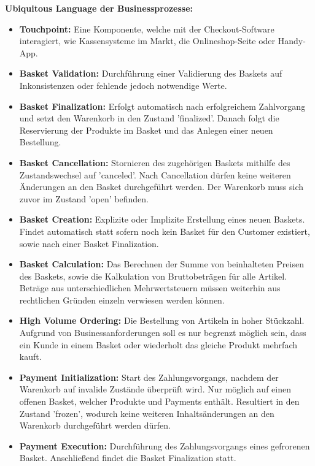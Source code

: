 \vspace{2em}

{\large \textbf{Ubiquitous Language der Businessprozesse:}}
\begin{itemize}[topsep=-3px]
	\item \textbf{Touchpoint: } { Eine Komponente, welche mit der Checkout-Software interagiert, wie Kassensysteme im Markt, die Onlineshop-Seite oder Handy-App.}
	\item \textbf{Basket Validation: } {Durchführung einer Validierung des Baskets auf Inkonsistenzen oder fehlende jedoch notwendige Werte.}
	\item \textbf{Basket Finalization: } {Erfolgt automatisch nach erfolgreichem Zahlvorgang und setzt den Warenkorb in den Zustand 'finalized'. Danach folgt die Reservierung der Produkte im Basket und das Anlegen einer neuen Bestellung.}
	\item \textbf{Basket Cancellation: } {Stornieren des zugehörigen Baskets mithilfe des Zustandswechsel auf 'canceled'. Nach Cancellation dürfen keine weiteren Änderungen an den Basket durchgeführt werden. Der Warenkorb muss sich zuvor im Zustand 'open' befinden. }
	\item \textbf{Basket Creation: } {Explizite oder Implizite Erstellung eines neuen Baskets. Findet automatisch statt sofern noch kein Basket für den Customer existiert, sowie nach einer Basket Finalization.}
	\item \textbf{Basket Calculation: } {Das Berechnen der Summe von beinhalteten Preisen des Baskets, sowie die Kalkulation von Bruttobeträgen für alle Artikel. Beträge aus unterschiedlichen Mehrwertsteuern müssen weiterhin aus rechtlichen Gründen einzeln verwiesen werden können.}
	\item \textbf{High Volume Ordering: } {Die Bestellung von Artikeln in hoher Stückzahl. Aufgrund von Businessanforderungen soll es nur begrenzt möglich sein, dass ein Kunde in einem Basket oder wiederholt das gleiche Produkt mehrfach kauft.}
	\item \textbf{Payment Initialization: } {Start des Zahlungsvorgangs, nachdem der Warenkorb auf invalide Zustände überprüft wird. Nur möglich auf einen offenen Basket, welcher Produkte und Payments enthält. Resultiert in den Zustand 'frozen', wodurch keine weiteren Inhaltsänderungen an den Warenkorb durchgeführt werden dürfen.}
	\item \textbf{Payment Execution: } {Durchführung des Zahlungsvorgangs eines gefrorenen Basket. Anschließend findet die Basket Finalization statt.}
\end{itemize}
\vspace{2em}

